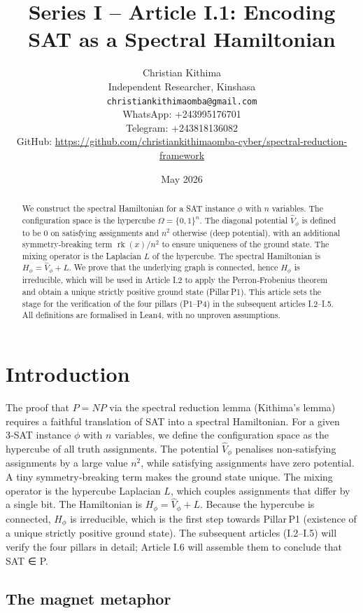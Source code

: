 \documentclass[11pt,a4paper]{article}
\title{Series I – Article I.1: Encoding SAT as a Spectral Hamiltonian}
\author{Christian Kithima \\
Independent Researcher, Kinshasa \\
\texttt{christiankithimaomba@gmail.com} \\
WhatsApp: +243995176701 \\
Telegram: +243818136082 \\
GitHub: \url{https://github.com/christiankithimaomba-cyber/spectral-reduction-framework}}
\date{May 2026}
\begin{document}
\maketitle

\begin{abstract}
We construct the spectral Hamiltonian for a SAT instance $\phi$ with $n$ variables. The configuration space is the hypercube $\Omega = \{0,1\}^n$. The diagonal potential $\hat{V}_\phi$ is defined to be $0$ on satisfying assignments and $n^2$ otherwise (deep potential), with an additional symmetry‑breaking term $\operatorname{rk}(x)/n^2$ to ensure uniqueness of the ground state. The mixing operator is the Laplacian $L$ of the hypercube. The spectral Hamiltonian is $H_\phi = \hat{V}_\phi + L$. We prove that the underlying graph is connected, hence $H_\phi$ is irreducible, which will be used in Article I.2 to apply the Perron‑Frobenius theorem and obtain a unique strictly positive ground state (Pillar P1). This article sets the stage for the verification of the four pillars (P1–P4) in the subsequent articles I.2–I.5. All definitions are formalised in Lean4, with no unproven assumptions.
\end{abstract}

\tableofcontents

\section{Introduction}

The proof that $P = NP$ via the spectral reduction lemma (Kithima's lemma) requires a faithful translation of SAT into a spectral Hamiltonian. For a given 3‑SAT instance $\phi$ with $n$ variables, we define the configuration space as the hypercube of all truth assignments. The potential $\hat{V}_\phi$ penalises non‑satisfying assignments by a large value $n^2$, while satisfying assignments have zero potential. A tiny symmetry‑breaking term makes the ground state unique. The mixing operator is the hypercube Laplacian $L$, which couples assignments that differ by a single bit. The Hamiltonian is $H_\phi = \hat{V}_\phi + L$. Because the hypercube is connected, $H_\phi$ is irreducible, which is the first step towards Pillar P1 (existence of a unique strictly positive ground state). The subsequent articles (I.2–I.5) will verify the four pillars in detail; Article I.6 will assemble them to conclude that SAT ∈ P.

\subsection{The magnet metaphor}
\end{document}
